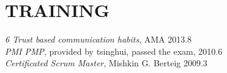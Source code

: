
\section{TRAINING}

{\em 6 Trust based communication habits}, AMA \hfill 2013.8
\\
{\em PMI PMP}, provided by tsinghui, passed the exam, \hfill 2010.6
\\
{\em Certificated Scrum Master}, Mishkin G. Berteig \hfill 2009.3

